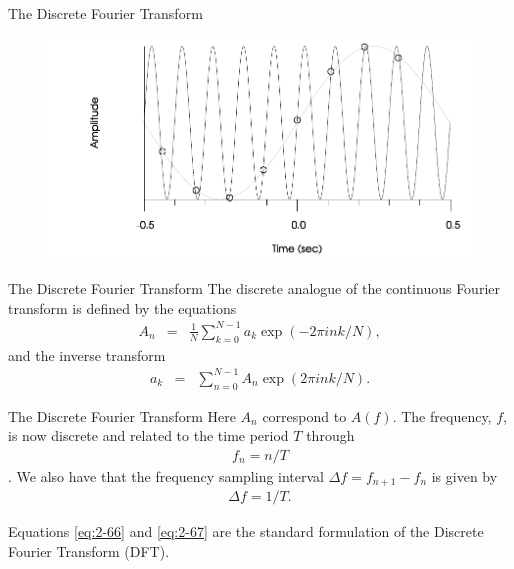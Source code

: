 \documentclass[xcolor=dvipsnames,notes]{beamer}
\begin{document}
\begin{frame}{The Discrete Fourier Transform}
%
\begin{figure}
\includegraphics{Fig/alias.pdf}
\end{figure}
%
\end{frame}
\begin{frame}{The Discrete Fourier Transform}
The discrete analogue of the continuous Fourier transform is defined by the equations
%
\begin{eqnarray}
  A_n   &=& \frac{1}{N}\sum^{N-1}_{k=0} a_k\exp(-2\pi i n k/N),
    \label{eq:2-66}
\end{eqnarray}
%
and the inverse transform
%
\begin{eqnarray}
  a_k   &=& \sum^{N-1}_{n=0} A_n\exp(2\pi i n k /N).
    \label{eq:2-67}
\end{eqnarray}
%
\end{frame}
\begin{frame}{The Discrete Fourier Transform}
Here $A_n$ correspond to $A(f)$.
The frequency, $f$, is now discrete and related to the time period $T$ through
\begin{eqnarray}
f_n=n/T
\end{eqnarray}.
We also have that the frequency sampling interval $\Delta f=f_{n+1}-f_{n}$ is given
by
\begin{eqnarray}
 \Delta f = 1/T.
\end{eqnarray}

Equations \eqref{eq:2-66} and \eqref{eq:2-67} are the standard formulation
of the Discrete Fourier Transform (DFT). 
\end{frame}
\end{document}
